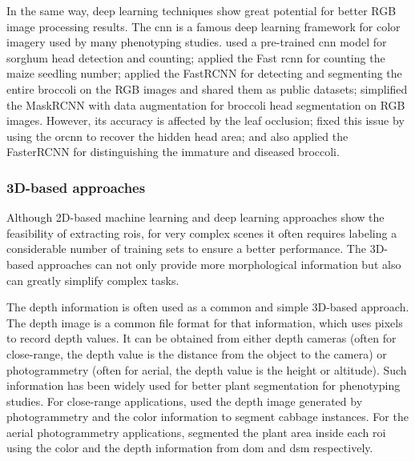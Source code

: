 In the same way, deep learning techniques show great potential for better RGB image processing results. The \gls{cnn} is a famous deep learning framework for color imagery used by many phenotyping studies. \citet{ghosal_weakly_2019} used a pre-trained \gls{cnn} model for sorghum head detection and counting; \citet{liu_estimating_2022} applied the Fast \gls{rcnn} for counting the maize seedling number; \citet{bender_high_2020} applied the FastRCNN for detecting and segmenting the entire broccoli on the RGB images and shared them as public datasets; \citet{blok_effect_2021} simplified the MaskRCNN with data augmentation for broccoli head segmentation on RGB images. However, its accuracy is affected by the leaf occlusion; \citet{blok_image_2021} fixed this issue by using the \gls{orcnn} to recover the hidden head area; and \citet{garcia_towards_2021} also applied the FasterRCNN for distinguishing the immature and diseased broccoli. 
 

\subsubsection{3D-based approaches}

Although 2D-based machine learning and deep learning approaches show the feasibility of extracting \gls{roi}s, for very complex scenes it often requires labeling a considerable number of training sets to ensure a better performance. The 3D-based approaches can not only provide more morphological information but also can greatly simplify complex tasks.

The depth information is often used as a common and simple 3D-based approach. The depth image is a common file format for that information, which uses pixels to record depth values. It can be obtained from either depth cameras (often for close-range, the depth value is the distance from the object to the camera) or photogrammetry (often for aerial, the depth value is the height or altitude). Such information has been widely used for better plant segmentation for phenotyping studies. For close-range applications, \citep{luling_using_2021} used the depth image generated by photogrammetry and the color information to segment cabbage instances. For the aerial photogrammetry applications, \citet{guo_fieldbased_2020} segmented the plant area inside each \gls{roi} using the color and the depth information from \gls{dom} and \gls{dsm} respectively. 

